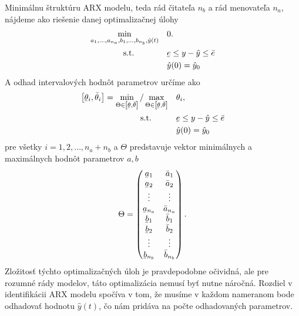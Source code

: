 Minimálnu štruktúru ARX modelu, teda rád čitateľa $ n_b $ a rád menovateľa $ n_a $, nájdeme ako riešenie danej optimalizačnej úlohy
\begin{equation}
	\begin{split}
		\min_{a_{1},\dots,a_{n_a},b_{1},\dots,b_{n_b},\hat{y}(t)} & \quad 0.\\
		\text{s.t.} \qquad \quad  & \quad \ubar{e} \leq y - \hat{y} \leq \bar{e} \\
		& \quad \hat{y}(0) = \hat{y}_{0}
	\end{split}
	\label{eq:gpe_arx_min_rad}
\end{equation}
A odhad intervalových hodnôt parametrov určíme ako
\begin{equation}
	\begin{split}
		\left[ \ubar{\theta}_i, \bar{\theta}_i \right] = \min_{\Theta \in \left[ \ubar{\theta}, \bar{\theta} \right]} / \max_{\Theta \in \left[ \ubar{\theta}, \bar{\theta} \right]} & \quad \theta_i,\\
		\text{s.t.} \qquad & \quad \ubar{e} \leq y - \hat{y} \leq \bar{e}\\
		& \quad \hat{y}(0) = \hat{y}_{0}
	\end{split}
	\label{eq:gpe_arx_param_est}
\end{equation}
pre všetky $ i = 1,2, \dots, n_a+n_b $ a $ \Theta $ predstavuje vektor minimálnych a maximálnych hodnôt parametrov $ a, b $
\begin{equation*}
	\Theta = 
	\begin{pmatrix}
		\ubar{a}_{1} & \bar{a}_{1}\\
		\ubar{a}_{2} & \bar{a}_{2}\\
		\vdots & \vdots\\
		\ubar{a}_{n_a} & \bar{a}_{n_a}\\
		\ubar{b}_{1} & \bar{b}_{1}\\
		\ubar{b}_{2} & \bar{b}_{2}\\
		\vdots & \vdots\\
		\ubar{b}_{n_b} & \bar{b}_{n_b}\\	
	\end{pmatrix}.
\end{equation*}
Zložitosť týchto optimalizačných úloh je pravdepodobne očividná, ale pre rozumné rády modelov, táto optimalizácia nemusí byť nutne náročná. Rozdiel v identifikácii ARX modelu spočíva v tom, že musíme v každom nameranom bode odhadovať hodnotu $ \hat{y}(t) $, čo nám pridáva na počte odhadovaných parametrov.

